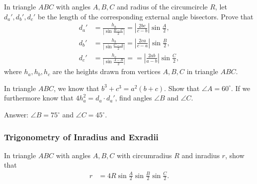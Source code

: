 \begin{tcolorbox}
    \begin{question}[name=Calculating the Length of External Angle Bisectors]
        In triangle $ABC$ with angles $A,B,C$ and radius of the circumcircle $R$, let $d_a',d_b',d_c'$ be the length of the corresponding external angle bisectors. Prove that
        \begin{align*}
            d_a' &= \displaystyle \frac{h_a}{\displaystyle\left|\sin\frac{B-C}{2}\right|}=\left|\frac{2bc}{c-b}\right|\sin\frac{A}{2},\\
            d_b' &= \displaystyle \frac{h_b}{\displaystyle\left|\sin\frac{C-A}{2}\right|}=\left|\frac{2ca}{c-a}\right|\sin\frac{B}{2},\\
            d_c' &= \displaystyle \frac{h_c}{\displaystyle\left|\sin\frac{A-B}{2}\right|}==\left|\frac{2ab}{a-b}\right|\sin\frac{C}{2},
        \end{align*}
        where $h_a,h_b,h_c$ are the heights drawn from vertices $A,B,C$ in triangle $ABC$.
    \end{question}
\end{tcolorbox}


\begin{question}
    In triangle $ABC$, we know that $b^3+c^3 = a^2(b+c).$ Show that $\angle A = 60^\circ$. If we furthermore know that $4h_a^2=d_a\cdot d_a'$, find angles $\angle B$ and $\angle C$.
\end{question}

\begin{solution}
    Answer: $\angle B = 75^{\circ}$ and $\angle C = 45^{\circ}$.
\end{solution}


\subsubsection{Trigonometry of Inradius and Exradii}

\begin{tcolorbox}
    \begin{question}[name=Calculating the Inradius]
        In triangle $ABC$ with angles $A,B,C$ with circumradius $R$ and inradius $r$, show that
        \begin{align*}
            r &= 4R\sin\frac{A}{2}\sin\frac{B}{2}\sin\frac{C}{2}.
        \end{align*}
    \end{question}
\end{tcolorbox}



